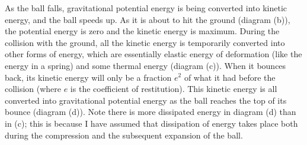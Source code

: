 \documentclass[10pt]{article}
\begin{document}
As the ball falls, gravitational potential energy is being converted into kinetic energy, and the ball speeds up. As it is about to hit the ground (diagram (b)), the potential energy is zero and the kinetic energy is maximum. During the collision with the ground, all the kinetic energy is temporarily converted into other forms of energy, which are essentially elastic energy of deformation (like the energy in a spring) and some thermal energy (diagram (c)). When it bounces back, its kinetic energy will only be a fraction $e^{2}$ of what it had before the collision (where $e$ is the coefficient of restitution). This kinetic energy is all converted into gravitational potential energy as the ball reaches the top of its bounce (diagram (d)). Note there is more dissipated energy in diagram (d) than in (c); this is because I have assumed that dissipation of energy takes place both during the compression and the subsequent expansion of the ball.
\end{document}
